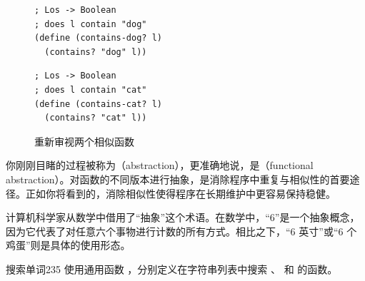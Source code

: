 \begin{figure}[htbp]
  \centering
  \begin{stepperbox}[unbreakable]
    \noindent\begin{minipage}[t]{0.48\linewidth}\vspace{0pt}
\begin{Verbatim}[commandchars=\\\{\}, fontsize=\fontsize{6.0pt}{7.2pt}\selectfont]
; Los -> Boolean
; does l contain "dog"
(define (contains-dog? l)
  (contains? "dog" l))
\end{Verbatim}
    \end{minipage}\hfill
    \begin{minipage}[t]{0.48\linewidth}\vspace{0pt}
\begin{Verbatim}[commandchars=\\\{\}, fontsize=\fontsize{6.0pt}{7.2pt}\selectfont]
; Los -> Boolean
; does l contain "cat"
(define (contains-cat? l)
  (contains? "cat" l))
\end{Verbatim}
    \end{minipage}
  \end{stepperbox}
  \caption{重新审视两个相似函数}
  \label{fig:87}
\end{figure}

你刚刚目睹的过程被称为（abstraction），更准确地说，是（functional abstraction）。对函数的不同版本进行抽象，是消除程序中重复与相似性的首要途径。正如你将看到的，消除相似性使得程序在长期维护中更容易保持稳健。

\begin{notebox}[“抽象”的数学来源]
计算机科学家从数学中借用了“抽象”这个术语。在数学中，“6”是一个抽象概念，因为它代表了对任意六个事物进行计数的所有方式。相比之下，“6 英寸”或“6 个鸡蛋”则是具体的使用形态。
\end{notebox}

\begin{exercise}{搜索单词}{235}
使用通用函数 ，分别定义在字符串列表中搜索 、 和  的函数。
\end{exercise}

